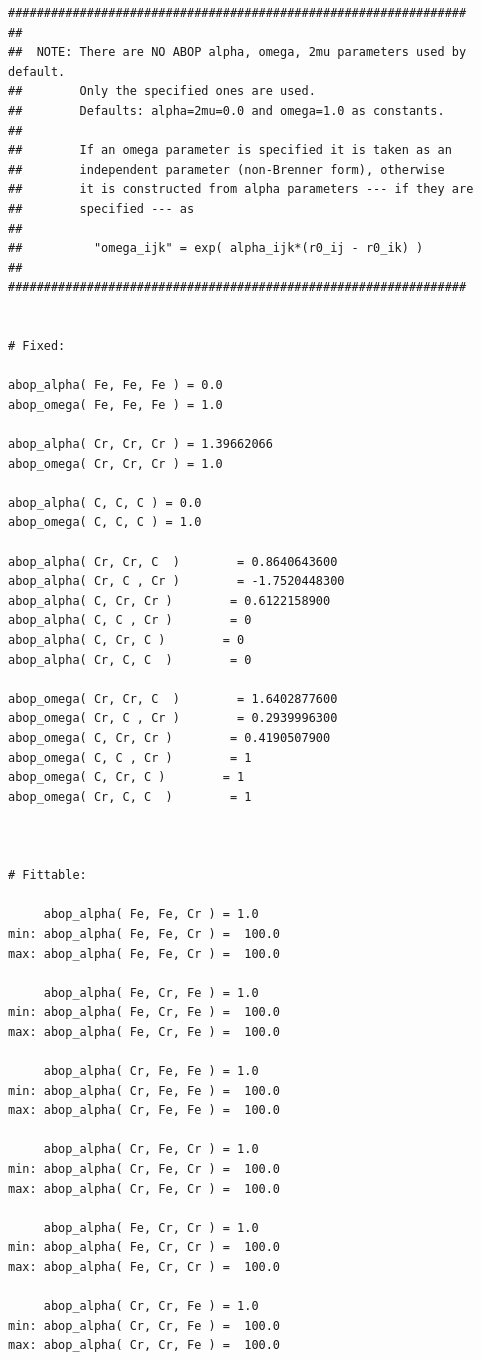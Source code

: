 \documentclass[a4paper,12pt,pdftex,onecolumn]{article}
\begin{document}
\begin{Verbatim}[fontsize=\relsize{-1},frame=single]
################################################################
##
##  NOTE: There are NO ABOP alpha, omega, 2mu parameters used by default.
##        Only the specified ones are used.
##        Defaults: alpha=2mu=0.0 and omega=1.0 as constants.
##
##        If an omega parameter is specified it is taken as an
##        independent parameter (non-Brenner form), otherwise
##        it is constructed from alpha parameters --- if they are
##        specified --- as
##
##          "omega_ijk" = exp( alpha_ijk*(r0_ij - r0_ik) )
##
################################################################


# Fixed:

abop_alpha( Fe, Fe, Fe ) = 0.0
abop_omega( Fe, Fe, Fe ) = 1.0

abop_alpha( Cr, Cr, Cr ) = 1.39662066
abop_omega( Cr, Cr, Cr ) = 1.0

abop_alpha( C, C, C ) = 0.0
abop_omega( C, C, C ) = 1.0

abop_alpha( Cr, Cr, C  )        = 0.8640643600
abop_alpha( Cr, C , Cr )        = -1.7520448300
abop_alpha( C, Cr, Cr )        = 0.6122158900
abop_alpha( C, C , Cr )        = 0
abop_alpha( C, Cr, C )        = 0
abop_alpha( Cr, C, C  )        = 0

abop_omega( Cr, Cr, C  )        = 1.6402877600
abop_omega( Cr, C , Cr )        = 0.2939996300
abop_omega( C, Cr, Cr )        = 0.4190507900
abop_omega( C, C , Cr )        = 1
abop_omega( C, Cr, C )        = 1
abop_omega( Cr, C, C  )        = 1



# Fittable:

     abop_alpha( Fe, Fe, Cr ) = 1.0
min: abop_alpha( Fe, Fe, Cr ) =  100.0
max: abop_alpha( Fe, Fe, Cr ) =  100.0

     abop_alpha( Fe, Cr, Fe ) = 1.0
min: abop_alpha( Fe, Cr, Fe ) =  100.0
max: abop_alpha( Fe, Cr, Fe ) =  100.0

     abop_alpha( Cr, Fe, Fe ) = 1.0
min: abop_alpha( Cr, Fe, Fe ) =  100.0
max: abop_alpha( Cr, Fe, Fe ) =  100.0

     abop_alpha( Cr, Fe, Cr ) = 1.0
min: abop_alpha( Cr, Fe, Cr ) =  100.0
max: abop_alpha( Cr, Fe, Cr ) =  100.0

     abop_alpha( Fe, Cr, Cr ) = 1.0
min: abop_alpha( Fe, Cr, Cr ) =  100.0
max: abop_alpha( Fe, Cr, Cr ) =  100.0

     abop_alpha( Cr, Cr, Fe ) = 1.0
min: abop_alpha( Cr, Cr, Fe ) =  100.0
max: abop_alpha( Cr, Cr, Fe ) =  100.0





\end{Verbatim}
\end{document}
